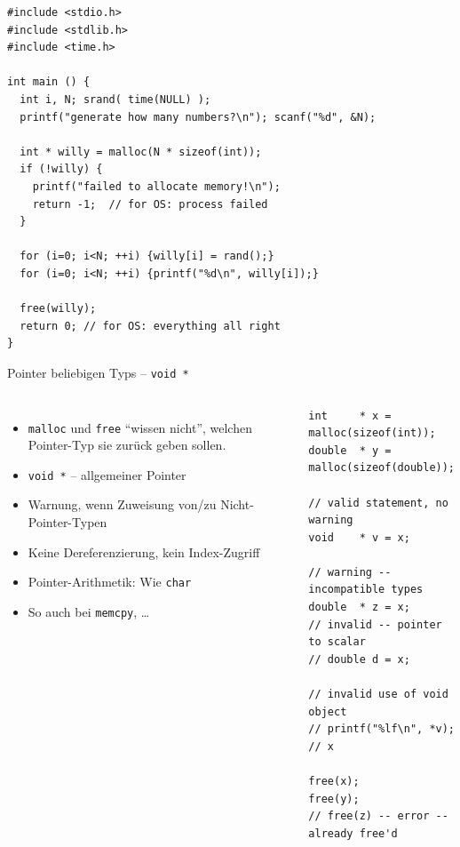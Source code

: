 \begin{frame}[fragile]
%

\begin{codebox}
\begin{verbatim}
#include <stdio.h>
#include <stdlib.h>
#include <time.h>

int main () {
  int i, N; srand( time(NULL) );
  printf("generate how many numbers?\n"); scanf("%d", &N);
  
  int * willy = malloc(N * sizeof(int));
  if (!willy) {
    printf("failed to allocate memory!\n");
    return -1;	// for OS: process failed
  }
  
  for (i=0; i<N; ++i) {willy[i] = rand();}
  for (i=0; i<N; ++i) {printf("%d\n", willy[i]);}
  
  free(willy);
  return 0; // for OS: everything all right
}
\end{verbatim}
\end{codebox}
%
\end{frame}


\begin{frame}[fragile]{Pointer beliebigen Typs -- \texttt{void *}}
%
\begin{columns}[T]
%
\begin{itemize}
\item \texttt{malloc} und \texttt{free} \enquote{wissen nicht}, welchen Pointer-Typ sie zurück geben sollen.
\item \texttt{void *} -- allgemeiner Pointer
\item Warnung, wenn Zuweisung von/zu Nicht-Pointer-Typen
\item Keine Dereferenzierung, kein Index-Zugriff
\item Pointer-Arithmetik: Wie \texttt{char}
\item So auch bei \texttt{memcpy}, \ldots
\end{itemize}
%
\vspace{-15pt}
\begin{codebox}
\begin{verbatim}
int     * x = malloc(sizeof(int));
double  * y = malloc(sizeof(double));

// valid statement, no warning
void    * v = x;

// warning -- incompatible types
double  * z = x;
// invalid -- pointer to scalar
// double d = x;

// invalid use of void object
// printf("%lf\n", *v);  // x

free(x);
free(y);
// free(z) -- error -- already free'd
\end{verbatim}
\end{codebox}
\end{columns}

%
\end{frame}

